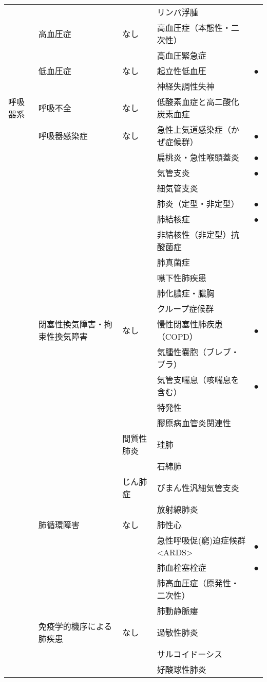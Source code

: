 \begin{xltabular}{\linewidth}{XXXXX}
 &  &  & リンパ浮腫 &  \\
 & 高血圧症 & なし & 高血圧症（本態性・二次性） &  \\
 &  &  & 高血圧緊急症 &  \\
 & 低血圧症 & なし & 起立性低血圧 & ● \\
 &  &  & 神経失調性失神 &  \\
呼吸器系 & 呼吸不全 & なし & 低酸素血症と高二酸化炭素血症 &  \\
 & 呼吸器感染症 & なし & 急性上気道感染症（かぜ症候群） & ● \\
 &  &  & 扁桃炎・急性喉頭蓋炎 & ● \\
 &  &  & 気管支炎 & ● \\
 &  &  & 細気管支炎 &  \\
 &  &  & 肺炎（定型・非定型） & ● \\
 &  &  & 肺結核症 & ● \\
 &  &  & 非結核性（非定型）抗酸菌症 &  \\
 &  &  & 肺真菌症 &  \\
 &  &  & 嚥下性肺疾患 &  \\
 &  &  & 肺化膿症・膿胸 &  \\
 &  &  & クループ症候群 &  \\
 & 閉塞性換気障害・拘束性換気障害 & なし & 慢性閉塞性肺疾患 （COPD） & ● \\
 &  &  & 気腫性嚢胞（ブレブ・ブラ） &  \\
 &  &  & 気管支喘息（咳喘息を含む） & ● \\
 &  &  & 特発性 &  \\
 &  &  & 膠原病血管炎関連性 &  \\
 &  & 間質性肺炎 & 珪肺 &  \\
 &  &  & 石綿肺 &  \\
 &  & じん肺症 & びまん性汎細気管支炎 &  \\
 &  &  & 放射線肺炎 &  \\
 & 肺循環障害 & なし & 肺性心 &  \\
 &  &  & 急性呼吸促(窮)迫症候群 <ARDS> & ● \\
 &  &  & 肺血栓塞栓症 & ● \\
 &  &  & 肺高血圧症（原発性・二次性） &  \\
 &  &  & 肺動静脈瘻 &  \\
 & 免疫学的機序による肺疾患 & なし & 過敏性肺炎 &  \\
 &  &  & サルコイドーシス &  \\
 &  &  & 好酸球性肺炎 &  \\

\end{xltabular}

